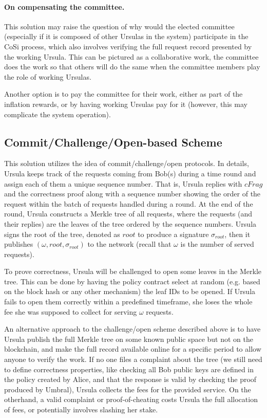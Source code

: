 \paragraph{\bf On compensating the committee.} 
This solution may raise the question of why would the elected committee (especially if it is composed of other Ursulas in the system) participate in the CoSi process, which also involves verifying the full request record presented by the working Ursula. This can be pictured as a collaborative work, the committee does the work so that others will do the same when the committee members play the role of working Ursulas.


Another option is to pay the committee for their work, either as part of the inflation rewards, or by having working Ursulas pay for it (however, this may complicate the system operation).


\subsection{Commit/Challenge/Open-based Scheme}
This solution utilizes the idea of commit/challenge/open protocols. In details, Ursula keeps track of the requests coming from Bob(s) during a time round and assign each of them a unique sequence number. That is, Ursula replies with $cFrag$ and the correctness proof along with a sequence number showing the order of the request within the batch of requests handled during a round. At the end of the round, Ursula constructs a Merkle tree of all requests, where the requests (and their replies) are the leaves of the tree ordered by the sequence numbers. Ursula signs the root of the tree, denoted as $root$ to produce a signature $\sigma_{root}$, then it publishes $(\omega, root, \sigma_{root})$ to the network (recall that $\omega$ is the number of served requests). 


To prove correctness, Ursula will be challenged to open some leaves in the Merkle tree. This can be done by having the policy contract select at random (e.g. based on the block hash or any other mechanism) the leaf IDs to be opened. If Ursula fails to open them correctly within a predefined timeframe, she loses the whole fee she was supposed to collect for serving $\omega$ requests.


An alternative approach to the challenge/open scheme described above is to have Ursula publish the full Merkle tree on some known public space but not on the blockchain, and make the full record available online for a specific period to allow anyone to verify the work. If no one files a complaint about the tree (we still need to define correctness properties, like checking all Bob public keys are defined in the policy created by Alice, and that the response is valid by checking the proof produced by Umbral), Ursula collects the fees for the provided service. On the otherhand, a valid complaint or proof-of-cheating costs Ursula the full allocation of fees, or potentially involves slashing her stake.
